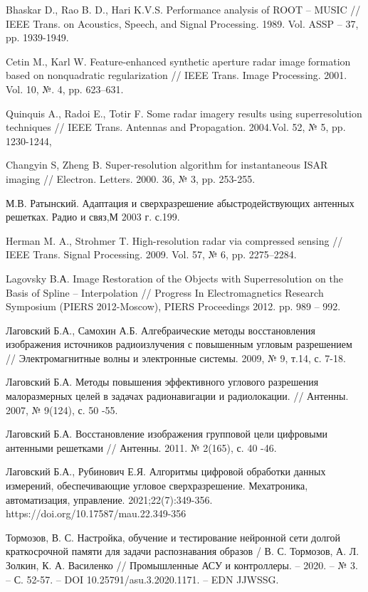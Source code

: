 \documentclass{article}
\begin{document}
	\begin{thebibliography}{}
		 Bhaskar D., Rao B. D., Hari K.V.S. Performance analysis of ROOT – MUSIC // IEEE Trans. on Acoustics, Speech, and Signal Processing. 1989. Vol. ASSP – 37, pp. 1939-1949.
		
		 Cetin M., Karl W. Feature-enhanced synthetic aperture radar image formation based on nonquadratic regularization // IEEE Trans. Image Processing. 2001. Vol. 10, №. 4, pp. 623–631.
		
		 Quinquis A., Radoi E., Totir F. Some radar imagery results using superresolution techniques // IEEE Trans. Antennas and Propagation. 2004.Vol. 52, № 5, pp. 1230-1244, 
		
		 Changyin S, Zheng B.  Super-resolution algorithm for instantaneous ISAR imaging // Electron. Letters. 2000. 36, № 3, pp. 253-255.
		
		 М.В. Ратынский. Адаптация и сверхразрешение абыстродействующих антенных решетках. Радио и связ,М  2003 г. с.199.
		
		 Herman M. A., Strohmer T. High-resolution radar via compressed sensing //  IEEE Trans. Signal Processing. 2009. Vol. 57, № 6, pp. 2275–2284.
		
		 Lagovsky B.А. Image Restoration of the Objects with Superresolution on the Basis of Spline – Interpolation //  Progress In Electromagnetics Research Symposium (PIERS 2012-Moscow), PIERS Proceedings 2012. pp. 989 – 992.
		
		 Лаговский Б.А., Самохин А.Б. Алгебраические методы восстановления изображения источников радиоизлучения с повышенным угловым разрешением //  Электромагнитные волны и электронные  системы.  2009, № 9, т.14,  с. 7-18.
		
		 Лаговский Б.А. Методы повышения эффективного углового  разрешения малоразмерных целей в задачах радионавигации  и  радиолокации.  // Антенны. 2007,  № 9(124),  с. 50 -55.
		
		 Лаговский Б.А. Восстановление изображения групповой цели цифровыми антенными решетками // Антенны. 2011. № 2(165), с. 40 -46.
		
		 Лаговский Б.А., Рубинович Е.Я. Алгоритмы цифровой обработки данных измерений, обеспечивающие угловое сверхразрешение. Мехатроника, автоматизация, управление. 2021;22(7):349-356. https://doi.org/10.17587/mau.22.349-356
		
		 Тормозов, В. С. Настройка, обучение и тестирование нейронной сети долгой краткосрочной памяти для задачи распознавания образов / В. С. Тормозов, А. Л. Золкин, К. А. Василенко // Промышленные АСУ и контроллеры. – 2020. – № 3. – С. 52-57. – DOI 10.25791/asu.3.2020.1171. – EDN JJWSSG.
		

\end{thebibliography}
\end{document}
